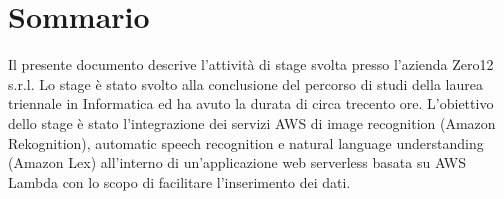 
\cleardoublepage
{}
{}
\begingroup
\let\clearpage\relax
\let\cleardoublepage\relax
\let\cleardoublepage\relax

\chapter*{Sommario}

Il presente documento descrive l’attività di stage svolta presso l’azienda Zero12 s.r.l. Lo stage è stato svolto alla conclusione del percorso di studi della laurea triennale in Informatica ed ha avuto la durata di circa trecento ore. L’obiettivo dello stage è stato l’integrazione dei servizi AWS di image recognition (Amazon Rekognition), automatic speech recognition e natural language understanding (Amazon Lex) all’interno di un’applicazione web serverless basata su AWS Lambda con lo scopo di facilitare l’inserimento dei dati. 

%
%

\endgroup			

\vfill

